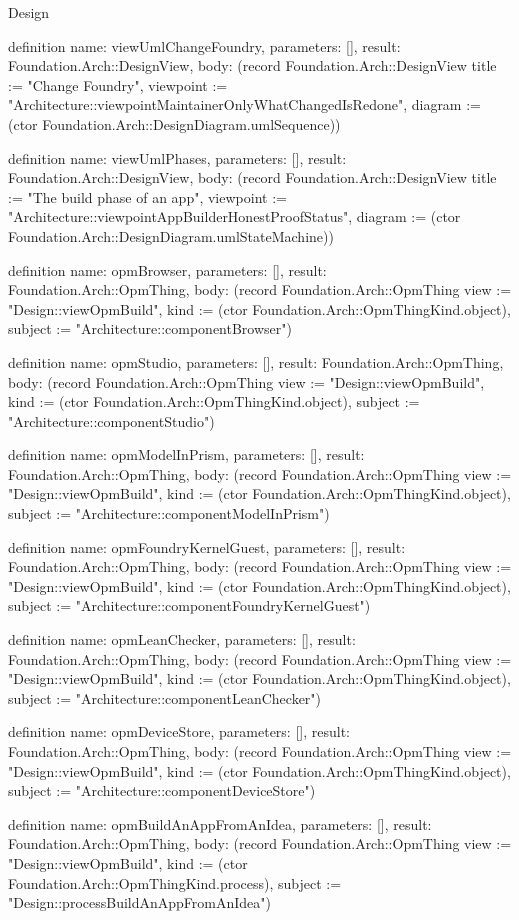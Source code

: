 \begin{lexlean}{Design}
\begin{semanticmodule}
definition{
  name: viewUmlChangeFoundry,
  parameters: [],
  result: Foundation.Arch::DesignView,
  body: (record Foundation.Arch::DesignView {title := "Change Foundry", viewpoint := "Architecture::viewpointMaintainerOnlyWhatChangedIsRedone", diagram := (ctor Foundation.Arch::DesignDiagram.umlSequence)})
}

definition{
  name: viewUmlPhases,
  parameters: [],
  result: Foundation.Arch::DesignView,
  body: (record Foundation.Arch::DesignView {title := "The build phase of an app", viewpoint := "Architecture::viewpointAppBuilderHonestProofStatus", diagram := (ctor Foundation.Arch::DesignDiagram.umlStateMachine)})
}

definition{
  name: opmBrowser,
  parameters: [],
  result: Foundation.Arch::OpmThing,
  body: (record Foundation.Arch::OpmThing {view := "Design::viewOpmBuild", kind := (ctor Foundation.Arch::OpmThingKind.object), subject := "Architecture::componentBrowser"})
}

definition{
  name: opmStudio,
  parameters: [],
  result: Foundation.Arch::OpmThing,
  body: (record Foundation.Arch::OpmThing {view := "Design::viewOpmBuild", kind := (ctor Foundation.Arch::OpmThingKind.object), subject := "Architecture::componentStudio"})
}

definition{
  name: opmModelInPrism,
  parameters: [],
  result: Foundation.Arch::OpmThing,
  body: (record Foundation.Arch::OpmThing {view := "Design::viewOpmBuild", kind := (ctor Foundation.Arch::OpmThingKind.object), subject := "Architecture::componentModelInPrism"})
}

definition{
  name: opmFoundryKernelGuest,
  parameters: [],
  result: Foundation.Arch::OpmThing,
  body: (record Foundation.Arch::OpmThing {view := "Design::viewOpmBuild", kind := (ctor Foundation.Arch::OpmThingKind.object), subject := "Architecture::componentFoundryKernelGuest"})
}

definition{
  name: opmLeanChecker,
  parameters: [],
  result: Foundation.Arch::OpmThing,
  body: (record Foundation.Arch::OpmThing {view := "Design::viewOpmBuild", kind := (ctor Foundation.Arch::OpmThingKind.object), subject := "Architecture::componentLeanChecker"})
}

definition{
  name: opmDeviceStore,
  parameters: [],
  result: Foundation.Arch::OpmThing,
  body: (record Foundation.Arch::OpmThing {view := "Design::viewOpmBuild", kind := (ctor Foundation.Arch::OpmThingKind.object), subject := "Architecture::componentDeviceStore"})
}

definition{
  name: opmBuildAnAppFromAnIdea,
  parameters: [],
  result: Foundation.Arch::OpmThing,
  body: (record Foundation.Arch::OpmThing {view := "Design::viewOpmBuild", kind := (ctor Foundation.Arch::OpmThingKind.process), subject := "Design::processBuildAnAppFromAnIdea"})
}


\end{semanticmodule}
\end{lexlean}
